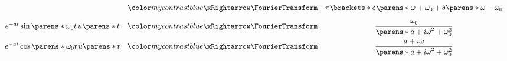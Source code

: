 \begin{multicols}{2}
\begin{CheatsheetEntryFrame}
\begin{equation*}
\begin{array}{ccc}
                &\TmpFTArrow&
                \pi \brackets*{
                    \delta\parens*{\omega + \omega_0}
                    + \delta\parens*{\omega - \omega_0}
                }
                \\[1em]
                e^{-a t} \sin\parens*{\omega_0 t} \, u\parens*{t}
                &\TmpFTArrow&
                \displaystyle
                \frac{\omega_0}{\parens*{a + i \omega}^2 + \omega_0^2}
                \\[1em]
                e^{-a t} \cos\parens*{\omega_0 t} \, u\parens*{t}
                &\TmpFTArrow&
                \displaystyle
                \frac{a + i \omega}{\parens*{a + i \omega}^2 + \omega_0^2}
            \end{array}
        \end{equation*}

    \end{CheatsheetEntryFrame}
    
\end{multicols}
\newpage
